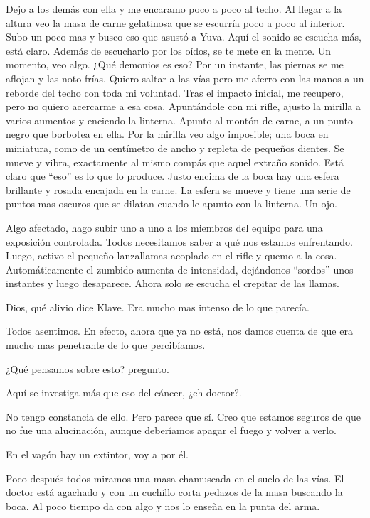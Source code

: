 Dejo a los demás con ella y me encaramo poco a poco al techo. Al llegar a la altura veo la masa de carne gelatinosa que se escurría poco a poco al interior. Subo un poco mas y busco eso que asustó a Yuva. Aquí el sonido se escucha más, está claro. Además de escucharlo por los oídos, se te mete en la mente. Un momento, veo algo. ¿Qué demonios es eso? Por un instante, las piernas se me aflojan y las noto frías. Quiero saltar a las vías pero me aferro con las manos a un reborde del techo con toda mi voluntad. Tras el impacto inicial, me recupero, pero no quiero acercarme a esa cosa. Apuntándole con mi rifle, ajusto la mirilla a varios aumentos y enciendo la linterna. Apunto al montón de carne, a un punto negro que borbotea en ella. Por la mirilla veo algo imposible; una boca en miniatura, como de un centímetro de ancho y repleta de pequeños dientes. Se mueve y vibra, exactamente al mismo compás que aquel extraño sonido. Está claro que ``eso'' es lo que lo produce. Justo encima de la boca hay una esfera brillante y rosada encajada en la carne. La esfera se mueve y tiene una serie de puntos mas oscuros que se dilatan cuando le apunto con la linterna. Un ojo.

Algo afectado, hago subir uno a uno a los miembros del equipo para una exposición controlada. Todos necesitamos saber a qué nos estamos enfrentando. Luego, activo el pequeño lanzallamas acoplado en el rifle y quemo a la cosa. Automáticamente el zumbido aumenta de intensidad, dejándonos ``sordos'' unos instantes y luego desaparece. Ahora solo se escucha el crepitar de las llamas.

\reply Dios, qué alivio \pause dice Klave\pauseend. Era mucho mas intenso de lo que parecía.

Todos asentimos. En efecto, ahora que ya no está, nos damos cuenta de que era mucho mas penetrante de lo que percibíamos.

\reply ¿Qué pensamos sobre esto? \pause pregunto.

\reply Aquí se investiga más que eso del cáncer, ¿eh doctor?. \klave

\reply No tengo constancia de ello. Pero parece que sí. Creo que estamos seguros de que no fue una alucinación, aunque deberíamos apagar el fuego y volver a verlo.

\reply En el vagón hay un extintor, voy a por él. \yuva

Poco después todos miramos una masa chamuscada en el suelo de las vías. El doctor está agachado y con un cuchillo corta pedazos de la masa buscando la boca. Al poco tiempo da con algo y nos lo enseña en la punta del arma.

